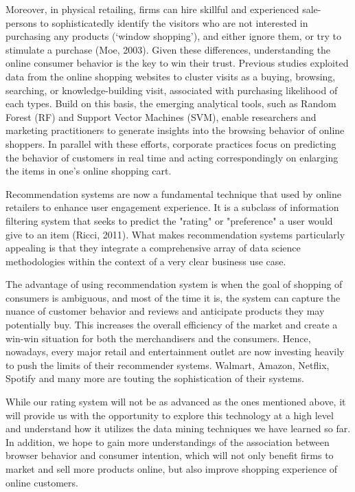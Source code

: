 \documentclass[final, 3p,12pt,times,letter,twocolumn]{elsarticle}
\begin{document}
\nohyphens{
Moreover, in physical retailing, firms can hire skillful and experienced sale-persons to sophisticatedly identify the visitors who are not interested in purchasing any products (`window shopping'), and either ignore them, or try to stimulate a purchase (Moe, 2003). Given these differences, understanding the online consumer behavior is the key to win their trust. Previous studies exploited data from the online shopping websites to cluster visits as a buying, browsing, searching, or knowledge-building visit, associated with purchasing likelihood of each types. Build on this basis, the emerging analytical tools, such as Random Forest (RF) and Support Vector Machines (SVM), enable researchers and marketing practitioners to generate insights into the browsing behavior of online shoppers. In parallel with these efforts, corporate practices focus on predicting the behavior of customers in real time and acting correspondingly on enlarging the items in one's online shopping cart.
}

Recommendation systems are now a fundamental technique that used by online retailers to enhance user engagement experience. It is a subclass of information filtering system that seeks to predict the "rating" or "preference" a user would give to an item (Ricci, 2011). What makes recommendation systems particularly appealing is that they integrate a comprehensive array of data science methodologies within the context of a very clear business use case. 

\nohyphens{
The advantage of using recommendation system is when the goal of shopping of consumers is ambiguous, and most of the time it is, the system can capture the nuance of customer behavior and reviews and anticipate products they may potentially buy. This increases the overall efficiency of the market and create a win-win situation for both the merchandisers and the consumers. Hence, nowadays, every major retail and entertainment outlet are now investing heavily to push the limits of their recommender systems. Walmart, Amazon, Netflix, Spotify and many more are touting the sophistication of their systems.
}

While our rating system will not be as advanced as the ones mentioned above, it will provide us with the opportunity to explore this technology at a high level and understand how it utilizes the data mining techniques we have learned so far. In addition, we hope to gain more understandings of the association between browser behavior and consumer intention, which will not only benefit firms to market and sell more products online, but also improve shopping experience of online customers.
\end{document}
